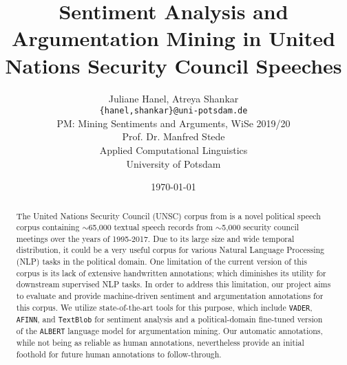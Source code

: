 \documentclass[12pt,a4paper]{article}
\title{Sentiment Analysis and Argumentation Mining in United
Nations Security Council Speeches}
\author{Juliane Hanel, Atreya Shankar\\
\texttt{\{hanel,shankar\}@uni-potsdam.de} \\
PM: Mining Sentiments and Arguments, WiSe 2019/20 \\
Prof. Dr. Manfred Stede \\
Applied Computational Linguistics\\
University of Potsdam}
\date{\today}
\begin{document}
\newgeometry{}
\maketitle
\thispagestyle{empty}
\begin{abstract}
The United Nations Security Council (UNSC) corpus from \citet{schnfeld2019security} is a novel political speech corpus containing $\sim$65,000 textual speech records from $\sim$5,000 security council meetings over the years of 1995-2017. Due to its large size and wide temporal distribution, it could be a very useful corpus for various Natural Language Processing (NLP) tasks in the political domain. One limitation of the current version of this corpus is its lack of extensive handwritten annotations; which diminishes its utility for downstream supervised NLP tasks. In order to address this limitation, our project aims to evaluate and provide machine-driven sentiment and argumentation annotations for this corpus. We utilize state-of-the-art tools for this purpose, which include \texttt{VADER}, \texttt{AFINN}, and \texttt{TextBlob} for sentiment analysis and a political-domain fine-tuned version of the \texttt{ALBERT} language model for argumentation mining. Our automatic annotations, while not being as reliable as human annotations, nevertheless provide an initial foothold for future human annotations to follow-through.
\end{abstract}
\newpage
\restoregeometry
\thispagestyle{empty}
\tableofcontents
\newpage
\setcounter{page}{1}
\thispagestyle{plain}






\newpage
{}


\nocite{*}
\end{document}

